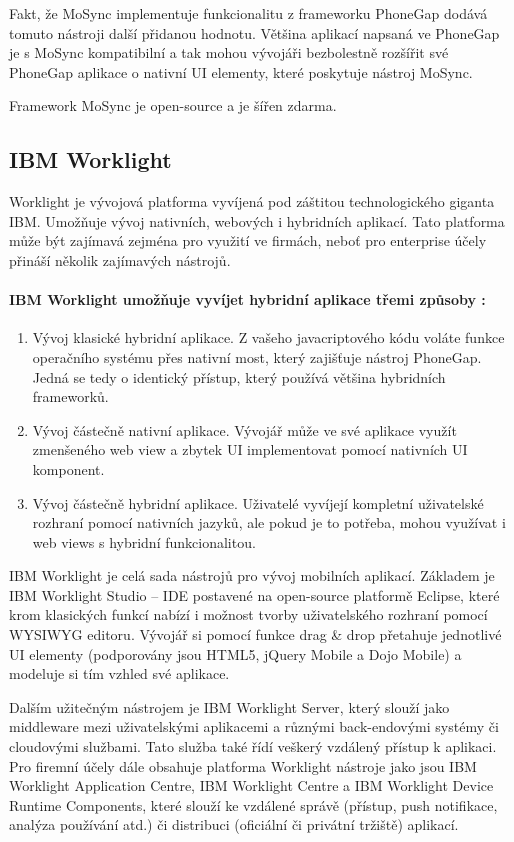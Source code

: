 Fakt, že MoSync implementuje funkcionalitu z frameworku PhoneGap dodává tomuto nástroji další přidanou hodnotu. Většina aplikací napsaná ve PhoneGap je s MoSync kompatibilní a tak mohou vývojáři bezbolestně rozšířit své PhoneGap aplikace o nativní UI elementy, které poskytuje nástroj MoSync.

Framework MoSync je open-source a je šířen zdarma.

\subsection{IBM Worklight}
Worklight je vývojová platforma vyvíjená pod záštitou technologického giganta IBM. Umožňuje vývoj nativních, webových i hybridních aplikací. Tato platforma může být zajímavá zejména pro využití ve firmách, neboť pro enterprise účely přináší několik zajímavých nástrojů.

\paragraph{IBM Worklight umožňuje vyvíjet hybridní aplikace třemi způsoby \cite{ibm_worklight_overview}:}
\begin{enumerate}
	\item Vývoj klasické hybridní aplikace. Z vašeho javacriptového kódu voláte funkce operačního systému přes nativní most, který zajišťuje nástroj PhoneGap. Jedná se tedy o identický přístup, který používá většina hybridních frameworků.
	\item Vývoj částečně nativní aplikace. Vývojář může ve své aplikace využít zmenšeného web view a zbytek UI implementovat pomocí nativních UI komponent.
	\item Vývoj částečně hybridní aplikace. Uživatelé vyvíjejí kompletní uživatelské rozhraní pomocí nativních jazyků, ale pokud je to potřeba, mohou využívat i web views s hybridní funkcionalitou.
\end{enumerate}

IBM Worklight je celá sada nástrojů pro vývoj mobilních aplikací. Základem je IBM Worklight Studio – IDE postavené na open-source platformě Eclipse, které krom klasických funkcí nabízí i možnost tvorby uživatelského rozhraní pomocí WYSIWYG editoru. Vývojář si pomocí funkce drag \& drop přetahuje jednotlivé UI elementy (podporovány jsou HTML5, jQuery Mobile a Dojo Mobile) a modeluje si tím vzhled své aplikace.

Dalším užitečným nástrojem je IBM Worklight Server, který slouží jako middleware mezi uživatelskými aplikacemi a různými back-endovými systémy či cloudovými službami. Tato služba také řídí veškerý vzdálený přístup k aplikaci. Pro firemní účely dále obsahuje platforma Worklight nástroje jako jsou  IBM Worklight Application Centre, IBM Worklight Centre a IBM Worklight Device Runtime Components, které slouží ke vzdálené správě (přístup, push notifikace, analýza používání atd.) či distribuci (oficiální či privátní tržiště) aplikací.

